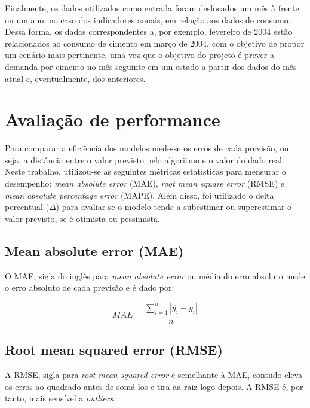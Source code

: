     Finalmente, os dados utilizados como entrada foram deslocados um mês à frente ou um ano, no caso dos indicadores anuais, em relação aos dados de consumo. Dessa forma, os dados correspondentes a, por exemplo, fevereiro de 2004 estão relacionados ao consumo de cimento em março de 2004, com o objetivo de propor um cenário mais pertinente, uma vez que o objetivo do projeto é prever a demanda por cimento no mês seguinte em um estado a partir dos dados do mês atual e, eventualmente, dos anteriores.

    \section{Avaliação de performance}

    Para comparar a eficiência dos modelos mede-se os erros de 
    cada previsão, ou seja, a distância entre o valor previsto 
    pelo algoritmo e o valor do dado real. Neste trabalho, 
    utilizou-se as seguintes métricas estatísticas para 
    mensurar o desempenho: \textit{mean absolute error} (MAE),
    \textit{root mean square  error} (RMSE) e \textit{mean 
    absolute percentage error} (MAPE). Além disso, foi utilizado
    o delta percentual ($\Delta$) para avaliar se o modelo tende 
    a subestimar ou superestimar o valor previsto, se é otimista
    ou pessimista.

\subsection{Mean absolute error (MAE)}

    O MAE, sigla do inglês para \textit{mean absolute error}
    ou média do erro absoluto mede o erro absoluto de cada previsão
    e é dado por:\cite{forecast-evaluation-ds}

    \begin{equation}
        MAE = \frac{\sum_{i=1}^n |\hat{y}_i - y_i|}{n}
    \end{equation}

\subsection{Root mean squared error (RMSE)}

    A RMSE, sigla para \textit{root mean squared  error} é
    semelhante à MAE, contudo eleva os erros ao quadrado antes de 
    somá-los e tira aa raiz logo depois. A RMSE é, por tanto, 
    mais sensível a \textit{outliers}.\cite{forecast-evaluation-ds}


